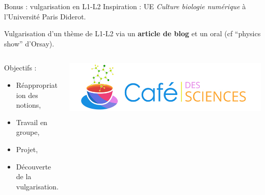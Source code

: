 \begin{frame}{Bonus : vulgarisation en L1-L2}
Inspiration : UE \emph{Culture biologie numérique} à l'Université Paris Diderot.

Vulgarisation d'un thème de L1-L2 via un \textbf{article de blog} et un oral (cf ``physics show'' d'Orsay).

\begin{columns}
\begin{column}{0.6\textwidth}
\begin{block}{Objectifs :}
	\begin{itemize}
		\item Réappropriation des notions,
		\item Travail en groupe,
		\item Projet,
		\item Découverte de la vulgarisation.
	\end{itemize}
\end{block}
\end{column}
\begin{column}{0.4\textwidth}
\centering
\includegraphics[width=\columnwidth]{img/3_projet_enseignement/banniere-cafe-big6}
\end{column}
\end{columns}
\end{frame}